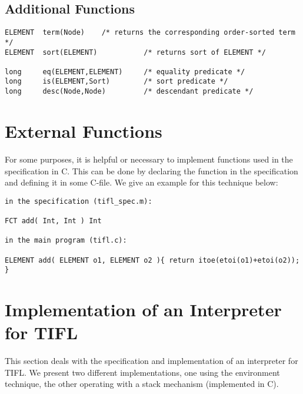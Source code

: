 \subsection{Additional Functions}
\begin{verbatim}
ELEMENT  term(Node)    /* returns the corresponding order-sorted term */
ELEMENT  sort(ELEMENT)           /* returns sort of ELEMENT */

long     eq(ELEMENT,ELEMENT)     /* equality predicate */    
long     is(ELEMENT,Sort)        /* sort predicate */
long     desc(Node,Node)         /* descendant predicate */            
\end{verbatim}

\section{External Functions}
For some purposes, it is helpful or necessary to implement functions used in the specification in C. This can be done by declaring the function in the specification and defining it in some C-file. We give an example for this technique below:
\begin{verbatim}
in the specification (tifl_spec.m):

FCT add( Int, Int ) Int

in the main program (tifl.c):

ELEMENT add( ELEMENT o1, ELEMENT o2 ){ return itoe(etoi(o1)+etoi(o2)); }

\end{verbatim}

\section{Implementation of an Interpreter for TIFL}
This section deals with the specification and implementation of an interpreter for TIFL. We present two different implementations, one using the environment technique, the other operating with a stack mechanism (implemented in C).
